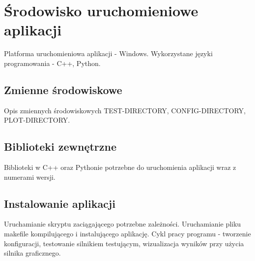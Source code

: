 \chapter{Środowisko uruchomieniowe aplikacji}
\thispagestyle{chapterBeginStyle}
Platforma uruchomieniowa aplikacji - Windows. Wykorzystane języki programowania - C++, Python.

\section{Zmienne środowiskowe}
Opis zmiennych środowiskowych TEST-DIRECTORY, CONFIG-DIRECTORY, PLOT-DIRECTORY.


\section{Biblioteki zewnętrzne}
Biblioteki w C++ oraz Pythonie potrzebne do uruchomienia aplikacji wraz z numerami wersji.

\section{Instalowanie aplikacji}
Uruchamianie skryptu zaciągającego potrzebne zależności.
Uruchamianie pliku makefile kompilującego i instalującego aplikację.
Cykl pracy programu - tworzenie konfiguracji, testowanie silnikiem testującym, wizualizacja wyników przy użycia
silnika graficznego.
